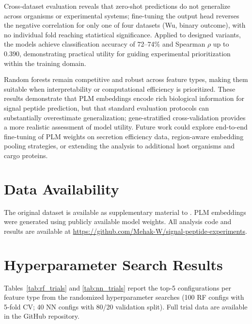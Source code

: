 \documentclass[12pt]{article}
\begin{document}
Cross-dataset evaluation reveals that zero-shot predictions do not generalize across organisms or experimental systems; fine-tuning the output head reverses the negative correlation for only one of four datasets (Wu, binary outcome), with no individual fold reaching statistical significance.
Applied to designed variants, the models achieve classification accuracy of 72--74\% and Spearman $\rho$ up to 0.390, demonstrating practical utility for guiding experimental prioritization within the training domain.

Random forests remain competitive and robust across feature types, making them suitable when interpretability or computational efficiency is prioritized.
These results demonstrate that PLM embeddings encode rich biological information for signal peptide prediction, but that standard evaluation protocols can substantially overestimate generalization; gene-stratified cross-validation provides a more realistic assessment of model utility.
Future work could explore end-to-end fine-tuning of PLM weights on secretion efficiency data, region-aware embedding pooling strategies, or extending the analysis to additional host organisms and cargo proteins.

\section*{Data Availability}

The original dataset is available as supplementary material to \citet{grasso2023}.
PLM embeddings were generated using publicly available model weights.
All analysis code and results are available at \url{https://github.com/Mehak-W/signal-peptide-experiments}.




\appendix

\section{Hyperparameter Search Results}
\label{app:hyperparam}

Tables~\ref{tab:rf_trials} and \ref{tab:nn_trials} report the top-5 configurations per feature type from the randomized hyperparameter searches (100 RF configs with 5-fold CV; 40 NN configs with 80/20 validation split).
Full trial data are available in the GitHub repository.
\end{document}
